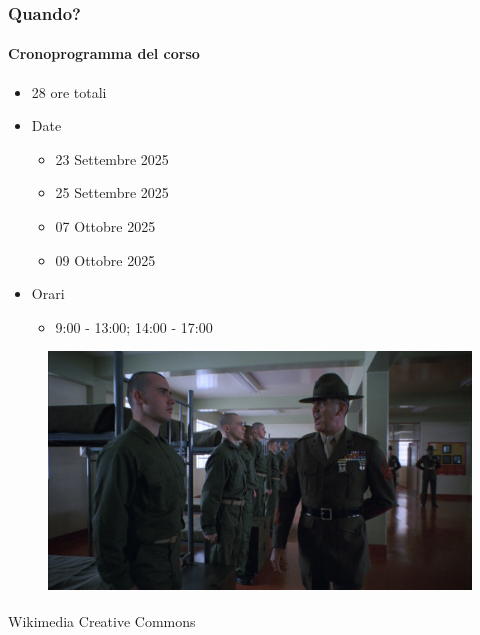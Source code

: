 \begin{frame}[t] \frametitle{Quando?}
\framesubtitle{Cronoprogramma del corso}
    \begin{itemize}[leftmargin=10pt,align=right]
        \item[\alert{\faHandORight}] 28 ore totali
        \item[\alert{\faHandORight}] Date
        \begin{itemize}[leftmargin=10pt,align=right]
            \item[\alert{\faHandORight}] 23 Settembre 2025
            \item[\alert{\faHandORight}] 25 Settembre 2025
            \item[\alert{\faHandORight}] 07 Ottobre 2025
            \item[\alert{\faHandORight}] 09 Ottobre 2025
        \end{itemize}
        \item[\alert{\faHandORight}] Orari
        \begin{itemize}[leftmargin=10pt,align=right]
            \item[\alert{\faHandORight}] 9:00 - 13:00; 14:00 - 17:00
        \end{itemize}         
    \end{itemize}
    \begin{center}
        \begin{minipage}[b]{.45\textwidth}
		    \begin{figure}[ht]
			    \includegraphics[width=\textwidth]{img/full-metal-jacket.jpg}
		    \end{figure}
            \begin{flushright}
                \vspace*{-10pt}
                {\tiny\textsuperscript{\textcopyright}Wikimedia Creative Commons}
            \end{flushright}
	    \end{minipage}
    \end{center}
\end{frame}

